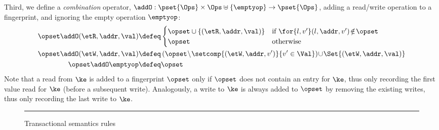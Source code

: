 Third, we define a \emph{combination} operator,
$\addO  : \pset{\Ops} \times \Ops \uplus \{\emptyop\} \rightarrow \pset{\Ops}$, 
adding a read/write operation to a fingerprint, and ignoring the empty operation $\emptyop$: 
\begin{align*}
    \opset \addO (\etR, \addr, \val)  
    & \defeq
    \begin{cases}
        \opset \cup \{(\etR, \addr, \val)\} & \text{if } \for{l, v'} (l, \addr, v') \! \notin \! \opset \\
        \opset &  \text{otherwise} \\
    \end{cases}  \\
    \opset \addO (\etW, \addr, \val) 
    & \defeq 
    \left( \opset \! \setminus \! \setcomp{(\etW, \addr, v')}{v' \in \Val} \right)  \!
    \cup \! \Set{(\etW, \addr, \val)} \\
    \opset \addO \emptyop  & \defeq \opset 
\end{align*}
Note that a read from $\ke$ is added to a fingerprint $\opset$ only if $\opset$ does not contain an entry for $\ke$, thus only recording the first value read for $\ke$ (before a subsequent write). 
Analogously, a write to $\ke$ is always added to $\opset$ by removing the existing writes, thus only recording the last write to $\ke$. 

%
\begin{figure*}[!t]
{}
\hrule\vspace{5pt}
\caption{Transactional semantics rules}
\label{fig:semantics-trans}
\end{figure*}

